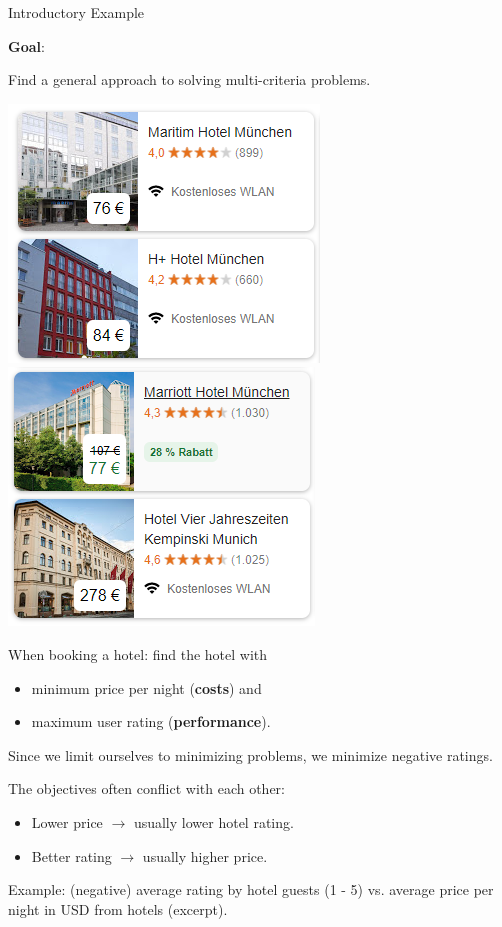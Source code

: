 \begin{frame}[allowframebreaks]{Introductory Example}
\vspace*{0.5cm}

\textbf{Goal}:

Find a general approach to solving multi-criteria problems.


\begin{center}
\includegraphics[width = 0.35\linewidth]{images/booking1.png} ~~~ \includegraphics[width = 0.35\linewidth]{images/booking2.png}
\end{center}

When booking a hotel: find the hotel with

\begin{itemize}
\item minimum price per night (\textbf{costs}) and
\item maximum user rating (\textbf{performance}).
\end{itemize}

\vfill

\begin{footnotesize}
Since we limit ourselves to minimizing problems, we minimize negative ratings.
\end{footnotesize}

\framebreak

The objectives often conflict with each other:

\begin{itemize}
\item Lower price $\to$ usually lower hotel rating.
\item Better rating $\to$ usually higher price.
\end{itemize}

Example: (negative) average rating by hotel guests (1 - 5) vs. average price per night in USD from hotels (excerpt).


\end{frame}
